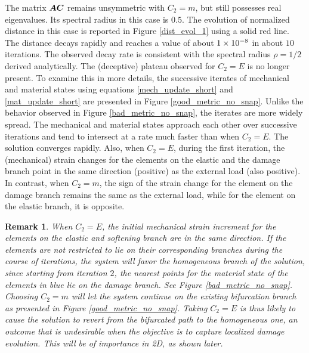 \documentclass[10pt]{cas-sc}
\newtheorem*{remark}{Remark}
\newcommand{\deleted}[1]{}
\newcommand{\added}[1]{#1}
\begin{document}
The matrix $\mbox{\boldmath $A$}  \mbox{\boldmath $C$} $ remains unsymmetric with $C_2=m$, but still possesses real eigenvalues. Its spectral radius in this case is $0.5$. \added{The evolution of normalized distance in this case is reported in Figure \ref{dist_evol_1} using a solid red line. The distance decays rapidly and reaches a value of about $\SI{1E-8}{}$ in about $10$ iterations. The observed decay rate is consistent with the spectral radius $\rho = 1/2$ derived analytically. The (deceptive) plateau observed for $C_2=E$ is no longer present. To examine this in more details, } the successive iterates of mechanical and material states using equations \eqref{mech_update_short} and \eqref{mat_update_short} are presented in Figure \ref{good_metric_no_snap}. Unlike the behavior observed in Figure \ref{bad_metric_no_snap}, the iterates are more widely spread. The mechanical and material states approach each other over successive iterations and tend to intersect at a rate much faster than when $C_2=E$. The solution converges \deleted{within just 7 iterations} \added{rapidly}. Also, when $C_2=E$, during the first iteration, the (mechanical) strain changes for the elements on the elastic and the damage branch point in the same direction (positive) as the external load (also positive). In contrast, when $C_2=m$, the sign of the strain change for the element on the damage branch remains the same as the external load, while for the element on the elastic branch, it is opposite. \deleted{Similar conclusions about the rate of convergence can be drawn even if the starting point is further down the damage branch. This case has been presented in appendix \ref{different_starting_point}.}

\begin{remark}
	When $C_2 = E$, the initial mechanical strain increment for the elements on the elastic and softening branch are in the same direction. If the elements are not restricted to lie on their corresponding branches during the course of iterations, the system will \deleted{thus} favor the homogeneous branch of the solution, since starting from iteration $2$, the nearest points for the material state of the elements in blue lie on the damage branch. See Figure \ref{bad_metric_no_snap}. Choosing $C_2=m$ will let the system continue on the existing bifurcation branch as presented in Figure \ref{good_metric_no_snap}. Taking $C_2 = E$ is thus likely to cause the solution to revert from the bifurcated path to the homogeneous one, an outcome that is undesirable when the objective is to capture localized damage evolution. This will be of importance in 2D, as shown later.
\end{remark}
\end{document}
